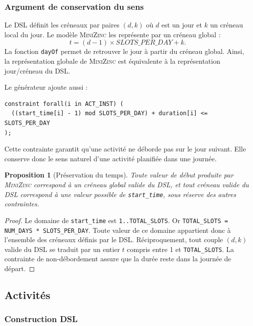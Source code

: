 \documentclass[12pt,a4paper]{article}
\newtheorem{proposition}{Proposition}[section]
\newcommand{\MZN}{\textsc{MiniZinc}}
\begin{document}
\subsubsection*{Argument de conservation du sens}

Le DSL définit les créneaux par paires $(d,k)$ où $d$ est un jour et $k$ un créneau local du jour. Le modèle \MZN{} les représente par un créneau global :
\[
t = (d-1) \times SLOTS\_PER\_DAY + k.
\]
La fonction \texttt{dayOf} permet de retrouver le jour à partir du créneau global. Ainsi, la représentation globale de \MZN{} est équivalente à la représentation jour/créneau du DSL.

Le générateur ajoute aussi :

\begin{lstlisting}[language=MiniZinc]
constraint forall(i in ACT_INST) (
  ((start_time[i] - 1) mod SLOTS_PER_DAY) + duration[i] <= SLOTS_PER_DAY
);
\end{lstlisting}

Cette contrainte garantit qu'une activité ne déborde pas sur le jour suivant. Elle conserve donc le sens naturel d'une activité planifiée dans une journée.

\begin{proposition}[Préservation du temps]
Toute valeur de début produite par \MZN{} correspond à un créneau global valide du DSL, et tout créneau valide du DSL correspond à une valeur possible de \texttt{start\_time}, sous réserve des autres contraintes.
\end{proposition}

\begin{proof}
Le domaine de \texttt{start\_time} est \texttt{1..TOTAL\_SLOTS}. Or \texttt{TOTAL\_SLOTS = NUM\_DAYS * SLOTS\_PER\_DAY}. Toute valeur de ce domaine appartient donc à l'ensemble des créneaux définis par le DSL. Réciproquement, tout couple $(d,k)$ valide du DSL se traduit par un entier $t$ compris entre 1 et \texttt{TOTAL\_SLOTS}. La contrainte de non-débordement assure que la durée reste dans la journée de départ.
\end{proof}

\subsection{Activités}

\subsubsection*{Construction DSL}
\end{document}
